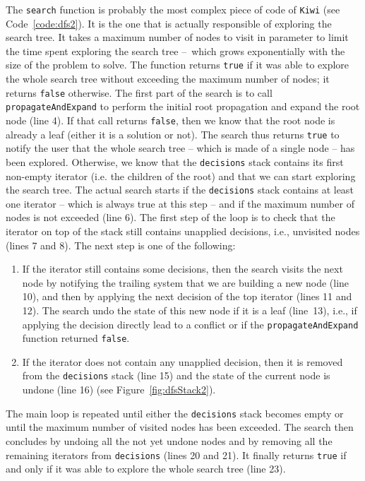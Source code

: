 \documentclass{llncs}
\newcommand{\fig}[1]{Figure~\ref{fig:#1}}
\begin{document}
\noindent
The \texttt{search} function is probably the most complex piece of code of \texttt{Kiwi} (see Code~\ref{code:dfs2}). 
It is the one that is actually responsible of exploring the search tree. 
It takes a maximum number of nodes to visit in parameter to limit the time spent exploring the search tree --~which grows exponentially with the size of the problem to solve. 
The function returns \texttt{true} if it was able to explore the whole search tree without exceeding the maximum number of nodes; it returns \texttt{false} otherwise. 
The first part of the search is to call \texttt{propagateAndExpand} to perform the initial root propagation and expand the root node (line 4). 
If that call returns \texttt{false}, then we know that the root node is already a leaf (either it is a solution or not).
The search thus returns \texttt{true} to notify the user that the whole search tree -- which is made of a single node -- has been explored.
Otherwise, we know that the \texttt{decisions} stack contains its first non-empty iterator (i.e. the children of the root) and that we can start exploring the search tree. 
%
The actual search starts if the \texttt{decisions} stack contains at least one iterator -- which is always true at this step -- and if the maximum number of nodes is not exceeded (line 6).
The first step of the loop is to check that the iterator on top of the stack still contains unapplied decisions, i.e., unvisited nodes (lines 7 and 8).
The next step is one of the following:
%
\begin{enumerate}

	\item If the iterator still contains some decisions, then the search visits the next node by notifying the trailing system that we are building a new node (line 10), and then by applying the next decision of the top iterator (lines 11 and 12). 
The search undo the state of this new node if it is a leaf (line~13), i.e., if applying the decision directly lead to a conflict or if the \texttt{propagateAndExpand} function returned \texttt{false}.

	\item If the iterator does not contain any unapplied decision, then it is removed from the \texttt{decisions} stack (line 15) and the state of the current node is undone (line 16) (see \fig{dfsStack2}). 
	
\end{enumerate}
%
The main loop is repeated until either the \texttt{decisions} stack becomes empty or until the maximum number of visited nodes has been exceeded. 
The search then concludes by undoing all the not yet undone nodes and by removing all the remaining iterators from \texttt{decisions} (lines 20 and 21). 
It finally returns \texttt{true} if and only if it was able to explore the whole search tree (line 23). 
\end{document}
